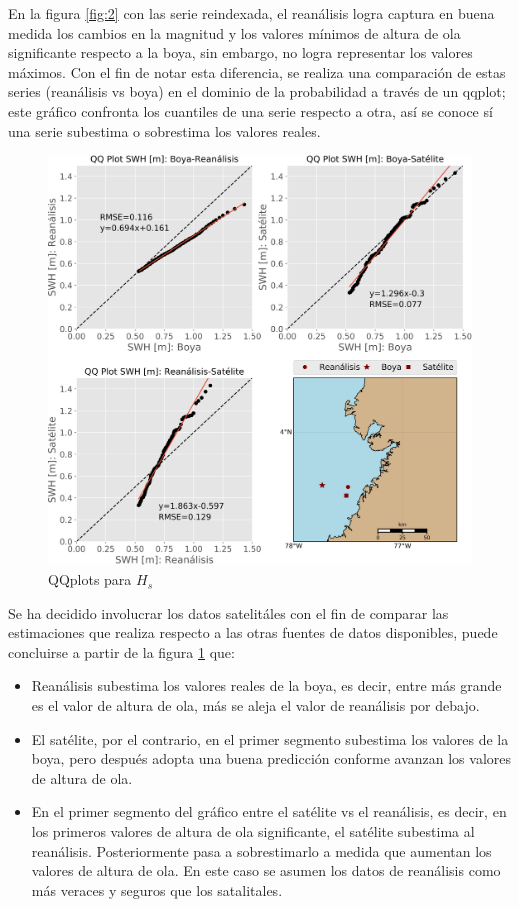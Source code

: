 \documentclass[5p,times,authoryear]{elsarticle}
\begin{document}
En la figura \ref{fig:2} con las serie reindexada, el reanálisis logra captura en buena medida los cambios en la magnitud y los valores mínimos de altura de ola significante respecto a la boya, sin embargo, no logra representar los valores máximos. Con el fin de notar esta diferencia, se realiza una comparación de estas series (reanálisis vs boya) en el dominio de la probabilidad a través de un qqplot; este gráfico confronta los cuantiles de una serie respecto a otra, así se conoce sí una serie subestima o sobrestima los valores reales.

\begin{figure}[h]
    \centering
    \includegraphics[scale=0.28]{Graficas/QQplots}
    \caption{QQplots para $H_s$}
    \label{fig:3}
\end{figure}

Se ha decidido involucrar los datos satelitáles con el fin de comparar las estimaciones que realiza respecto a las otras fuentes de datos disponibles, puede concluirse a partir de la figura \ref{fig:3} que:

\begin{itemize}
    \item Reanálisis subestima los valores reales de la boya, es decir, entre más grande es el valor de altura de ola, más se aleja el valor de reanálisis por debajo.
    
    \item El satélite, por el contrario, en el primer segmento subestima los valores de la boya, pero después adopta una buena predicción conforme avanzan los valores de altura de ola.

    \item En el primer segmento del gráfico entre el satélite vs el reanálisis, es decir, en los primeros valores de altura de ola significante, el satélite subestima al reanálisis. Posteriormente pasa a sobrestimarlo a medida que aumentan los valores de altura de ola. En este caso se asumen los datos de reanálisis como más veraces y seguros que los satalitales.
\end{itemize}
\end{document}
